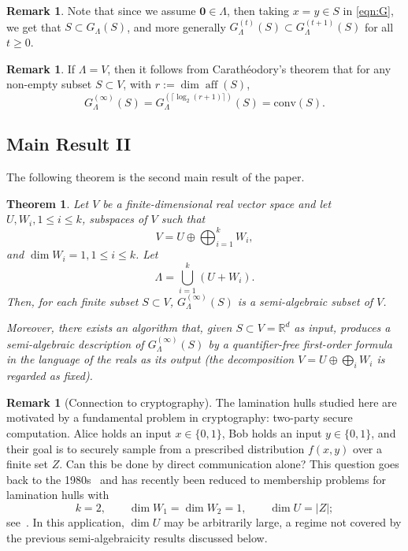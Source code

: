 \documentclass[10pt]{amsart}
\theoremstyle{plain}
\newtheorem{theorem}{Theorem}
\theoremstyle{definition}
\newtheorem{remark}[lemma]{Remark}
\let\leq\leqslant
\let\geq\geqslant
\begin{document}
\begin{remark}
\label{rem:monotonicity}
Note that
since we assume $\mathbf{0} \in \Lambda$, then taking $x = y \in S$ in  \eqref{eqn:G}, we get that $S \subset G_\Lambda(S)$, and more generally $G^{(t)}_\Lambda(S) \subset G^{(t+1)}_\Lambda(S)$ for all
$t \geq 0$.
\end{remark}





\begin{remark}
If $\Lambda = V$, then it follows from Carath\'eodory's theorem that for any non-empty subset $S \subset V$, with 
$r:=\dim\operatorname{aff}(S)$,
\[
G^{(\infty)}_\Lambda(S) = G^{(\lceil \log_2 (r+1) \rceil)}_\Lambda(S) = \mathrm{conv}(S).
\]
\end{remark}


\subsection{Main Result II}
\label{subsec:main2}
The following theorem is the second main result of the paper.

\begin{theorem}
\label{thm:laminar}
    Let $V$ be a finite-dimensional real vector space and let 
    $U, W_i, 1 \leq i \leq k$, subspaces of $V$ such that 
    \[
    V = U \oplus \bigoplus_{i=1}^{k} W_i,
    \]
    and $\dim W_i = 1, 1 \leq i \leq k$.
    Let 
    \begin{equation}
        \label{eqn:thm:laminar}
        \Lambda = \bigcup_{i=1}^k (U + W_i).
    \end{equation}
 Then, for each finite subset $S \subset V$, $G_\Lambda^{(\infty)}(S)$ is a semi-algebraic subset of $V$. 

Moreover, there exists an algorithm that, 
given $S \subset V = \mathbb{R}^d$ as input,
produces a semi-algebraic description 
of $G_\Lambda^{(\infty)}(S)$ by a quantifier-free 
first-order formula in the language of the reals 
as its output (the decomposition
\(V=U\oplus\bigoplus_i W_i\) is regarded as fixed).
\end{theorem}





\begin{remark}[Connection to cryptography]
The lamination hulls studied here are motivated by a fundamental problem in cryptography: two-party secure computation. 
Alice holds an input $x\in\{0,1\}$, Bob holds an input $y\in\{0,1\}$, and their goal is to securely sample from a prescribed distribution $f(x,y)$ over a finite set $Z$. 
Can this be done by direct communication alone? 
This question goes back to the 1980s~\cite{FOCS:Yao82b, STOC:GolMicWig87} and has recently been reduced to membership problems for lamination hulls with
\[
    k=2,\qquad \dim W_1=\dim W_2=1,\qquad \dim U=|Z|;
\]
see~\cite{FOCS:BKMN22}. 
In this application, $\dim U$ may be arbitrarily large,
a regime not covered by the previous semi-algebraicity results discussed below. 
\end{remark}
\end{document}
